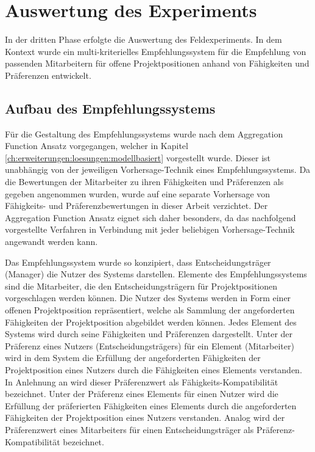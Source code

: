 \section{Auswertung des Experiments}
In der dritten Phase erfolgte die Auswertung des Feldexperiments.
In dem Kontext wurde ein multi-kriterielles Empfehlungssystem für die Empfehlung von passenden Mitarbeitern für offene Projektpositionen anhand von Fähigkeiten und Präferenzen entwickelt.

\subsection{Aufbau des Empfehlungssystems}
Für die Gestaltung des Empfehlungssystems wurde nach dem Aggregation Function Ansatz vorgegangen, welcher in Kapitel \ref{ch:erweiterungen:loesungen:modellbasiert} vorgestellt wurde.
Dieser ist unabhängig von der jeweiligen Vorhersage-Technik eines Empfehlungssystems.
Da die Bewertungen der Mitarbeiter zu ihren Fähigkeiten und Präferenzen als gegeben angenommen wurden, wurde auf eine separate Vorhersage von Fähigkeits- und Präferenzbewertungen in dieser Arbeit verzichtet.
Der Aggregation Function Ansatz eignet sich daher besonders, da das nachfolgend vorgestellte Verfahren in Verbindung mit jeder beliebigen Vorhersage-Technik angewandt werden kann.

Das Empfehlungssystem wurde so konzipiert, dass Entscheidungsträger (Manager) die Nutzer des Systems darstellen.
Elemente des Empfehlungssystems sind die Mitarbeiter, die den Entscheidungsträgern für Projektpositionen vorgeschlagen werden können.
Die Nutzer des Systems werden in Form einer offenen Projektposition repräsentiert, welche als Sammlung der angeforderten Fähigkeiten der Projektposition abgebildet werden können.
Jedes Element des Systems wird durch seine Fähigkeiten und Präferenzen dargestellt.
Unter der Präferenz eines Nutzers (Entscheidungsträgers) für ein Element (Mitarbeiter) wird in dem System die Erfüllung der angeforderten Fähigkeiten der Projektposition eines Nutzers durch die Fähigkeiten eines Elements verstanden.
In Anlehnung an \textcite[S. 207ff.]{pizzato:2010} wird dieser Präferenzwert als Fähigkeits-Kompatibilität bezeichnet.
Unter der Präferenz eines Elements für einen Nutzer wird die Erfüllung der präferierten Fähigkeiten eines Elements durch die angeforderten Fähigkeiten der Projektposition eines Nutzers verstanden.
Analog wird der Präferenzwert eines Mitarbeiters für einen Entscheidungsträger als Präferenz-Kompatibilität bezeichnet.

